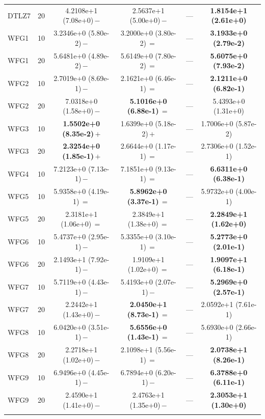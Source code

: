 \begin{table}[p]
\begin{tabular}{lc cccc}
DTLZ7 & 20 & 4.2108e+1 (7.08e+0)\,$-$ & 2.5637e+1 (5.00e+0)\,$-$ & --- & \textbf{1.8154e+1 (2.61e+0)} \\
\addlinespace[2pt]
WFG1 & 10 & 3.2346e+0 (5.80e-2)\,$-$ & 3.2000e+0 (3.80e-2)\,$=$ & --- & \textbf{3.1933e+0 (2.79e-2)} \\
WFG1 & 20 & 5.6481e+0 (4.89e-2)\,$-$ & 5.6149e+0 (7.80e-2)\,$=$ & --- & \textbf{5.6075e+0 (7.93e-2)} \\
\addlinespace[2pt]
WFG2 & 10 & 2.7019e+0 (8.69e-1)\,$-$ & 2.1621e+0 (6.46e-1)\,$=$ & --- & \textbf{2.1211e+0 (6.82e-1)} \\
WFG2 & 20 & 7.0318e+0 (1.58e+0)\,$-$ & \textbf{5.1016e+0 (6.88e-1)}\,$=$ & --- & 5.4393e+0 (1.31e+0) \\
\addlinespace[2pt]
WFG3 & 10 & \textbf{1.5502e+0 (8.35e-2)}\,$+$ & 1.6399e+0 (5.18e-2)\,$+$ & --- & 1.7006e+0 (5.87e-2) \\
WFG3 & 20 & \textbf{2.3254e+0 (1.85e-1)}\,$+$ & 2.6644e+0 (1.17e-1)\,$=$ & --- & 2.7306e+0 (1.52e-1) \\
\addlinespace[2pt]
WFG4 & 10 & 7.2123e+0 (7.13e-1)\,$-$ & 7.1851e+0 (9.13e-1)\,$=$ & --- & \textbf{6.6311e+0 (6.38e-1)} \\
\addlinespace[2pt]
WFG5 & 10 & 5.9358e+0 (4.19e-1)\,$=$ & \textbf{5.8962e+0 (3.37e-1)}\,$=$ & --- & 5.9732e+0 (4.00e-1) \\
WFG5 & 20 & 2.3181e+1 (1.06e+0)\,$=$ & 2.3849e+1 (1.38e+0)\,$=$ & --- & \textbf{2.2849e+1 (1.62e+0)} \\
\addlinespace[2pt]
WFG6 & 10 & 5.4737e+0 (2.95e-1)\,$-$ & 5.3355e+0 (3.10e-1)\,$=$ & --- & \textbf{5.2773e+0 (2.01e-1)} \\
WFG6 & 20 & 2.1493e+1 (7.92e-1)\,$-$ & 1.9109e+1 (1.02e+0)\,$=$ & --- & \textbf{1.9097e+1 (6.18e-1)} \\
\addlinespace[2pt]
WFG7 & 10 & 5.7119e+0 (4.43e-1)\,$-$ & 5.4193e+0 (2.07e-1)\,$-$ & --- & \textbf{5.2969e+0 (2.57e-1)} \\
WFG7 & 20 & 2.2442e+1 (1.43e+0)\,$-$ & \textbf{2.0450e+1 (8.73e-1)}\,$=$ & --- & 2.0592e+1 (7.61e-1) \\
\addlinespace[2pt]
WFG8 & 10 & 6.0420e+0 (3.51e-1)\,$-$ & \textbf{5.6556e+0 (1.43e-1)}\,$=$ & --- & 5.6930e+0 (2.66e-1) \\
WFG8 & 20 & 2.2718e+1 (1.02e+0)\,$-$ & 2.1098e+1 (5.56e-1)\,$=$ & --- & \textbf{2.0738e+1 (8.26e-1)} \\
\addlinespace[2pt]
WFG9 & 10 & 6.9496e+0 (4.45e-1)\,$-$ & 6.7894e+0 (6.20e-1)\,$-$ & --- & \textbf{6.3788e+0 (6.11e-1)} \\
WFG9 & 20 & 2.4590e+1 (1.41e+0)\,$-$ & 2.4763e+1 (1.35e+0)\,$-$ & --- & \textbf{2.3053e+1 (1.30e+0)} \\
\addlinespace[2pt]
\bottomrule
\end{tabular}
\end{table}
